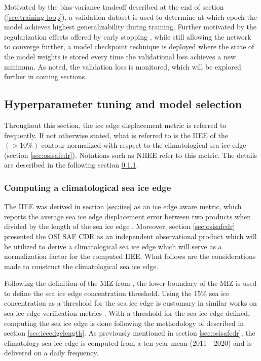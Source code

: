 \documentclass[../main/thesis]{subfiles}
\begin{document}
Motivated by the bias-variance tradeoff described at the end of section (\ref{sec:training-loop}), a validation dataset is used to determine at which epoch the model achieves highest generalizability during training. Further motivated by the regularization effects offered by early stopping \citep{Graves2013}, while still allowing the network to converge further, a model checkpoint technique is deployed where the state of the model weights is stored every time the validational loss achieves a new minimum. As noted, the validation loss is monitored, which will be explored further in coming sections.


\subsection{Hyperparameter tuning and model selection}
\label{sec:model_development_results}
Throughout this section, the ice edge displacement metric is referred to frequently. If not otherwise stated, what is referred to is the IIEE of the $(> 10\%)$ contour normalized with respect to the climatological sea ice edge (section \ref{sec:osisafcdr}). Notations such as NIIEE refer to this metric. The details are described in the following section \ref{sec:clim_iceedge_compute}.

\subsubsection{Computing a climatological sea ice edge}
\label{sec:clim_iceedge_compute}
The IIEE \citep{Goessling2016} was derived in section \ref{sec:iiee} as an ice edge aware metric, which reports the average sea ice edge displacement error between two products when divided by the length of the sea ice edge \citep{Melsom2019}. Moreover, section \ref{sec:osisafcdr} presented the OSI SAF CDR as an independent observational product which will be utilized to derive a climatological sea ice edge which will serve as a normalization factor for the computed IIEE. What follows are the considerations made to construct the climatological sea ice edge.

Following the definition of the MIZ from \citet{Strong2012}, the lower boundary of the MIZ is used to define the sea ice edge concentration threshold. Using the 15\% sea ice concentration as a threshold for the sea ice edge is customary in similar works on sea ice edge verification metrics \citep{Dukhovskoy2015,Goessling2016,Goessling2018,Melsom2019}. With a threshold for the sea ice edge defined, computing the sea ice edge is done following the methodology of \citet{Melsom2019} described in section \ref{sec:iceedgelength}. As previously mentioned in section \ref{sec:osisafcdr}, the climatology sea ice edge is computed from a ten year mean (2011 - 2020) and is delivered on a daily frequency.
\end{document}
